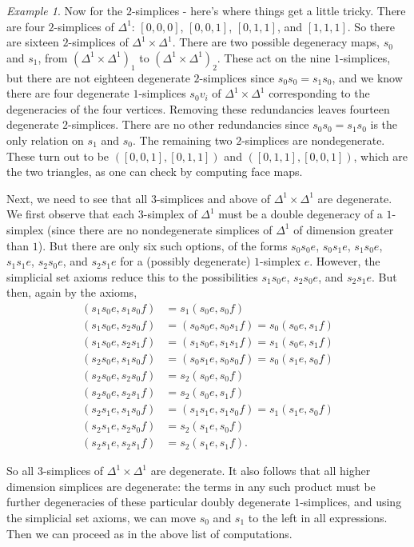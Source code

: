 \documentclass[12pt]{article}
\theoremstyle{plain}
\theoremstyle{definition}
\theoremstyle{remark}
\newtheorem{example}[theorem]{Example}
\begin{document}
\begin{example}
Now for the $2$-simplices - here's where things get a little tricky. There are four $2$-simplices of $\Delta^1$: $[0,0,0]$, $[0,0,1]$, $[0,1,1]$, and $[1,1,1]$.  So there are sixteen $2$-simplices of $\Delta^1\times \Delta^1$. There are two possible degeneracy maps,  $s_0$ and $s_1 $, from $(\Delta^1\times \Delta^1)_1$ to $(\Delta^1\times \Delta^1)_2$. These act on the nine $1$-simplices, but there are not eighteen degenerate $2$-simplices since $s_0s_0=s_1s_0$, and we know there are four degenerate $1$-simplices $s_0v_i$ of $\Delta^1\times \Delta^1$ corresponding to the degeneracies of the four vertices. Removing these redundancies leaves fourteen degenerate $2$-simplices. There are no other redundancies since $s_0s_0=s_1s_0$ is the only relation on $s_1$ and $s_0$. The remaining two $2$-simplices are nondegenerate. These turn out to be $([0,0,1],[0,1,1])$ and $([0,1,1],[0,0,1])$, which are the two triangles, as one can check by computing face maps. 

Next, we need to  see that all $3$-simplices and above of $\Delta^1\times \Delta^1$  are degenerate. We first observe that each $3$-simplex of $\Delta^1$  must be a double degeneracy of a $1$-simplex (since there are no nondegenerate simplices of $\Delta^1$ of dimension greater than $1$). But there are only six such options, of the forms $s_0s_0e$, $s_0s_1e$, $s_1s_0e$, $s_1s_1e$, $s_2s_0e$, and $s_2s_1e$ for a (possibly degenerate) $1$-simplex $e$. However, the simplicial set axioms reduce this to the possibilities $s_1s_0e$, $s_2s_0e$, and $s_2s_1e$. But then, again by the axioms, 
\begin{align*}
(s_1s_0e  ,s_1s_0f)&= s_1(s_0e,s_0f) \\
(s_1s_0e  ,s_2s_0f)&=(s_0s_0e  ,s_0s_1f)=s_0(s_0e  ,s_1f) \\
(s_1s_0e  ,s_2s_1f)&= (s_1s_0e  ,s_1s_1f)= s_1(s_0e  ,s_1f) \\
(s_2s_0e  ,s_1s_0f)&= (s_0s_1e    , s_0s_0f  )=s_0(s_1e    , s_0f  )\\
(s_2s_0e  ,s_2s_0f)&=s_2(s_0e  ,s_0f)   \\
(s_2s_0e  ,s_2s_1f)&= s_2(s_0e  ,s_1f)  \\
(s_2s_1e  ,s_1s_0f)&=(s_1s_1e  ,s_1s_0f)= s_1(s_1e  ,s_0f) \\
(s_2s_1e  ,s_2s_0f)&= s_2(s_1e  ,s_0f)  \\
(s_2s_1e  ,s_2s_1f)&= s_2(s_1e  ,s_1f).  
\end{align*}

So all $3$-simplices of $\Delta^1\times \Delta^1$ are degenerate. It also follows that all higher dimension simplices are degenerate:  the terms in any such product  must be further degeneracies of these particular doubly degenerate $1$-simplices, and using the simplicial set axioms, we can move $s_0$ and $s_1$ to the left in all expressions. Then we can proceed as in the above list of computations.
\end{example}
\end{document}
